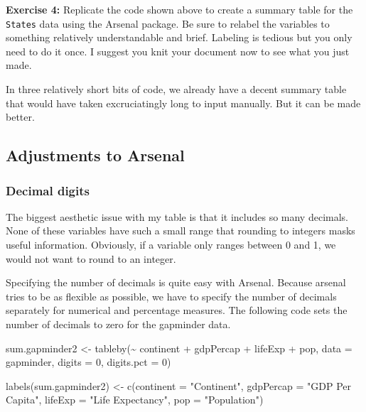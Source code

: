 \documentclass[
]{book}
\makeatletter
\newenvironment{Shaded}{\begin{snugshade}}{\end{snugshade}}
\newcommand{\AttributeTok}[1]{\textcolor[rgb]{0.61,0.61,0.61}{#1}}
\newcommand{\DecValTok}[1]{\textcolor[rgb]{0.06,0.06,0.06}{#1}}
\newcommand{\FunctionTok}[1]{\textcolor[rgb]{0,0,0}{#1}}
\newcommand{\NormalTok}[1]{#1}
\newcommand{\OtherTok}[1]{\textcolor[rgb]{0.37,0.37,0.37}{#1}}
\newcommand{\SpecialCharTok}[1]{\textcolor[rgb]{0,0,0}{#1}}
\newcommand{\StringTok}[1]{\textcolor[rgb]{0.5,0.5,0.5}{#1}}
\newenvironment{kframe}{%
\medskip{}
\setlength{\fboxsep}{.8em}
 \def\at@end@of@kframe{}%
 \ifinner\ifhmode%
  \def\at@end@of@kframe{\end{minipage}}%
  \begin{minipage}{\columnwidth}%
 \fi\fi%
 \def\FrameCommand##1{\hskip\@totalleftmargin \hskip-\fboxsep
 \colorbox{shadecolor}{##1}\hskip-\fboxsep
     \hskip-\linewidth \hskip-\@totalleftmargin \hskip\columnwidth}%
 \MakeFramed {\advance\hsize-\width
   \@totalleftmargin\z@ \linewidth\hsize
   \@setminipage}}%
 {\par\unskip\endMakeFramed%
 \at@end@of@kframe}
\renewenvironment{Shaded}{\begin{kframe}}{\end{kframe}}
\newenvironment{rmdblock}[1]
  {\begin{shaded*}
  }
  {\end{shaded*}
  }
\newenvironment{learncheck}
  {\begin{rmdblock}{warning}}
  {\end{rmdblock}}
\makeatother
\begin{document}
\begin{learncheck}
\textbf{Exercise 4:} Replicate the code shown above to create a summary
table for the \texttt{States} data using the Arsenal package. Be sure to
relabel the variables to something relatively understandable and brief.
Labeling is tedious but you only need to do it once. I suggest you knit
your document now to see what you just made.
\end{learncheck}

In three relatively short bits of code, we already have a decent summary table that would have taken excruciatingly long to input manually. But it can be made better.

\hypertarget{adjustments-to-arsenal}{%
\subsection{Adjustments to Arsenal}\label{adjustments-to-arsenal}}

\hypertarget{decimal-digits}{%
\subsubsection{Decimal digits}\label{decimal-digits}}

The biggest aesthetic issue with my table is that it includes so many decimals. None of these variables have such a small range that rounding to integers masks useful information. Obviously, if a variable only ranges between 0 and 1, we would not want to round to an integer.

Specifying the number of decimals is quite easy with Arsenal. Because arsenal tries to be as flexible as possible, we have to specify the number of decimals separately for numerical and percentage measures. The following code sets the number of decimals to zero for the gapminder data.

\begin{Shaded}
\begin{Highlighting}[]
\NormalTok{sum.gapminder2 }\OtherTok{\textless{}{-}} \FunctionTok{tableby}\NormalTok{(}\SpecialCharTok{\textasciitilde{}}\NormalTok{ continent }\SpecialCharTok{+}\NormalTok{ gdpPercap }\SpecialCharTok{+}\NormalTok{ lifeExp }\SpecialCharTok{+}\NormalTok{ pop, }\AttributeTok{data =}\NormalTok{ gapminder, }\AttributeTok{digits =} \DecValTok{0}\NormalTok{, }\AttributeTok{digits.pct =} \DecValTok{0}\NormalTok{)}

\FunctionTok{labels}\NormalTok{(sum.gapminder2) }\OtherTok{\textless{}{-}} \FunctionTok{c}\NormalTok{(}\AttributeTok{continent =} \StringTok{"Continent"}\NormalTok{, }\AttributeTok{gdpPercap =} \StringTok{"GDP Per Capita"}\NormalTok{, }\AttributeTok{lifeExp =} \StringTok{"Life Expectancy"}\NormalTok{, }\AttributeTok{pop =} \StringTok{"Population"}\NormalTok{)}
\end{Highlighting}
\end{Shaded}
\end{document}
